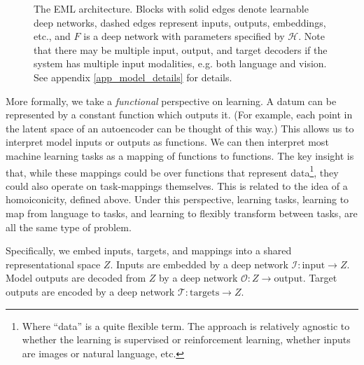 \documentclass{article}
\begin{document}
\begin{figure}
\caption{The EML architecture. Blocks with solid edges denote learnable deep networks, dashed edges represent inputs, outputs, embeddings, etc., and $F$ is a deep network with parameters specified by $\mathcal{H}$. Note that there may be multiple input, output, and target decoders if the system has multiple input modalities, e.g. both language and vision. See appendix \ref{app_model_details} for details.} \label{architecture_fig}
\end{figure}
More formally, we take a \emph{functional} perspective on learning. A datum can be represented by a constant function which outputs it. (For example, each point in the latent space of an autoencoder can be thought of this way.) This allows us to interpret model inputs or outputs as functions. We can then interpret most machine learning tasks as a mapping of functions to functions. The key insight is that, while these mappings could be over functions that represent data\footnote{Where ``data'' is a quite flexible term. The approach is relatively agnostic to whether the learning is supervised or reinforcement learning, whether inputs are images or natural language, etc.}, they could also operate on task-mappings themselves. This is related to the idea of a homoiconicity, defined above. Under this perspective, learning tasks, learning to map from language to tasks, and learning to flexibly transform between tasks, are all the same type of problem. \par
Specifically, we embed inputs, targets, and mappings into a shared representational space $Z$. Inputs are embedded by a deep network $\mathcal{I}: \text{input} \rightarrow Z$. Model outputs are decoded from $Z$ by a deep network $\mathcal{O}: Z \rightarrow \text{output}$. Target outputs are encoded by a deep network $\mathcal{T}: \text{targets} \rightarrow Z$.\par
\end{document}

